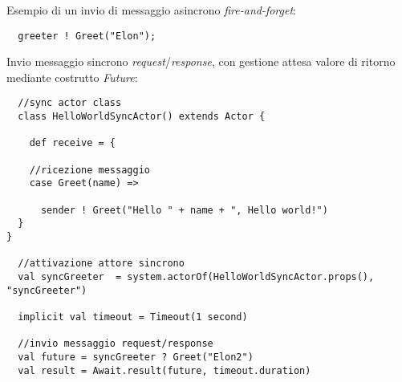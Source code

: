 Esempio di un invio di messaggio asincrono \textit{fire-and-forget}:

\begin{lstlisting}
  greeter ! Greet("Elon");
\end{lstlisting}

Invio messaggio sincrono \textit{request}/\textit{response}, con gestione attesa valore di ritorno mediante costrutto \textit{Future}:

\begin{lstlisting}
  //sync actor class
  class HelloWorldSyncActor() extends Actor {

    def receive = {

    //ricezione messaggio
    case Greet(name) =>

      sender ! Greet("Hello " + name + ", Hello world!")
  }
}

  //attivazione attore sincrono
  val syncGreeter  = system.actorOf(HelloWorldSyncActor.props(), "syncGreeter")

  implicit val timeout = Timeout(1 second)

  //invio messaggio request/response
  val future = syncGreeter ? Greet("Elon2")
  val result = Await.result(future, timeout.duration)
\end{lstlisting}

